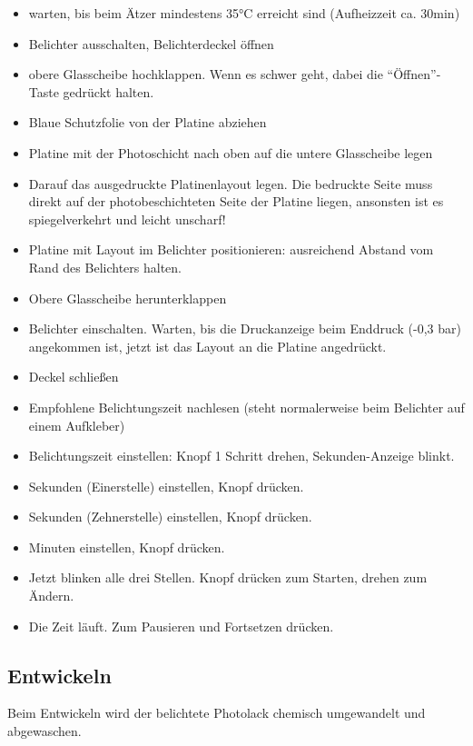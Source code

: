 \documentclass{\basedir/fablab-document}
\begin{document}
\begin{itemize}
\item warten, bis beim Ätzer mindestens 35°C erreicht sind (Aufheizzeit ca. 30min)
\item Belichter ausschalten, Belichterdeckel öffnen
\item obere Glasscheibe hochklappen. Wenn es schwer geht, dabei die \enquote{Öffnen}-Taste gedrückt halten.
\item Blaue Schutzfolie von der Platine abziehen
\item Platine mit der Photoschicht nach oben auf die untere Glasscheibe legen
\item Darauf das ausgedruckte Platinenlayout legen. Die bedruckte Seite muss direkt auf der photobeschichteten Seite der Platine liegen, ansonsten ist es spiegelverkehrt und leicht unscharf!
\item Platine mit Layout im Belichter positionieren: ausreichend Abstand vom Rand des Belichters halten.
\item Obere Glasscheibe herunterklappen
\item Belichter einschalten. Warten, bis die Druckanzeige beim Enddruck (-0,3 bar) angekommen ist, jetzt ist das Layout an die Platine angedrückt.
\item Deckel schließen 
\item Empfohlene Belichtungszeit nachlesen (steht normalerweise beim Belichter auf einem Aufkleber)
\item Belichtungszeit einstellen: Knopf 1 Schritt drehen, Sekunden-Anzeige blinkt.
\item Sekunden (Einerstelle) einstellen, Knopf drücken.
\item Sekunden (Zehnerstelle) einstellen, Knopf drücken.
\item Minuten einstellen, Knopf drücken.
\item Jetzt blinken alle drei Stellen. Knopf drücken zum Starten, drehen zum Ändern.
\item Die Zeit läuft. Zum Pausieren und Fortsetzen drücken.
\end{itemize}


\subsection{Entwickeln}
\label{sec:entwickeln}
Beim Entwickeln wird der belichtete Photolack chemisch umgewandelt und abgewaschen.
\end{document}
